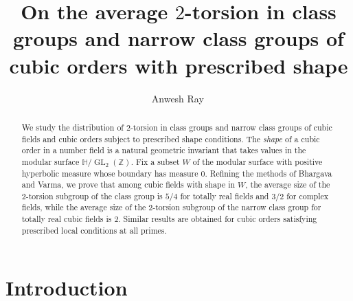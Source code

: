 \documentclass[table]{amsart}
\title[class groups of cubic orders with prescribed shape]{On the average $2$-torsion in class groups and narrow class groups of cubic orders with prescribed shape}
\author[A.~Ray]{Anwesh Ray\, \orcidlink{0000-0001-6946-1559}}
\numberwithin{equation}{section}
\begin{document}
\maketitle


\begin{abstract}
We study the distribution of $2$-torsion in class groups and narrow class groups
of cubic fields and cubic orders subject to prescribed shape conditions. The
\emph{shape} of a cubic order in a number field is a natural geometric invariant that takes values in the modular
surface $\mathbb{H}/\operatorname{GL}_2(\mathbb{Z})$. Fix a subset $W$ of the modular surface with positive hyperbolic measure whose boundary has measure $0$. Refining the methods of Bhargava and Varma, we prove that
among cubic fields with shape in $W$, the average size of the $2$-torsion subgroup
of the class group is $5/4$ for totally real fields and $3/2$ for complex fields,
while the average size of the $2$-torsion subgroup of the narrow class group for
totally real cubic fields is $2$. Similar results are obtained for cubic orders satisfying prescribed local conditions at all primes.
\end{abstract}


\section{Introduction}
\end{document}

